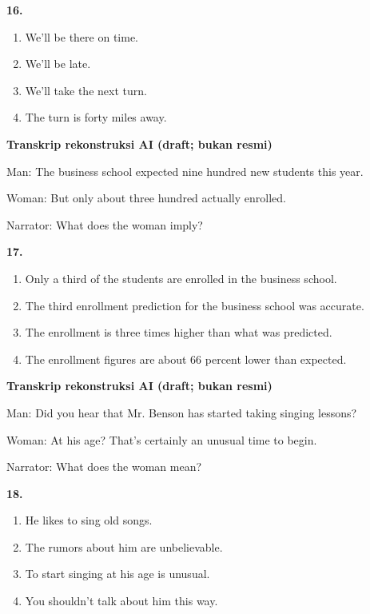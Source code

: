 \documentclass[12pt]{article}
\begin{document}
\noindent\textbf{16.}
\begin{enumerate}[label=(\Alph*),leftmargin=*,itemsep=0.2em]
\item We'll be there on time.
\item We'll be late.
\item We'll take the next turn.
\item The turn is forty miles away.
\end{enumerate}
\par
\vspace{0.25\baselineskip}
\begin{exampleblock}
\textbf{Transkrip rekonstruksi AI (draft; bukan resmi)}\par
Man: The business school expected nine hundred new students this year.\par
Woman: But only about three hundred actually enrolled.\par
Narrator: What does the woman imply?\par
\end{exampleblock}
\noindent\textbf{17.}
\begin{enumerate}[label=(\Alph*),leftmargin=*,itemsep=0.2em]
\item Only a third of the students are enrolled in the business school.
\item The third enrollment prediction for the business school was accurate.
\item The enrollment is three times higher than what was predicted.
\item The enrollment figures are about 66 percent lower than expected.
\end{enumerate}
\par
\vspace{0.25\baselineskip}
\begin{exampleblock}
\textbf{Transkrip rekonstruksi AI (draft; bukan resmi)}\par
Man: Did you hear that Mr. Benson has started taking singing lessons?\par
Woman: At his age? That's certainly an unusual time to begin.\par
Narrator: What does the woman mean?\par
\end{exampleblock}
\noindent\textbf{18.}
\begin{enumerate}[label=(\Alph*),leftmargin=*,itemsep=0.2em]
\item He likes to sing old songs.
\item The rumors about him are unbelievable.
\item To start singing at his age is unusual.
\item You shouldn't talk about him this way.
\end{enumerate}
\end{document}

